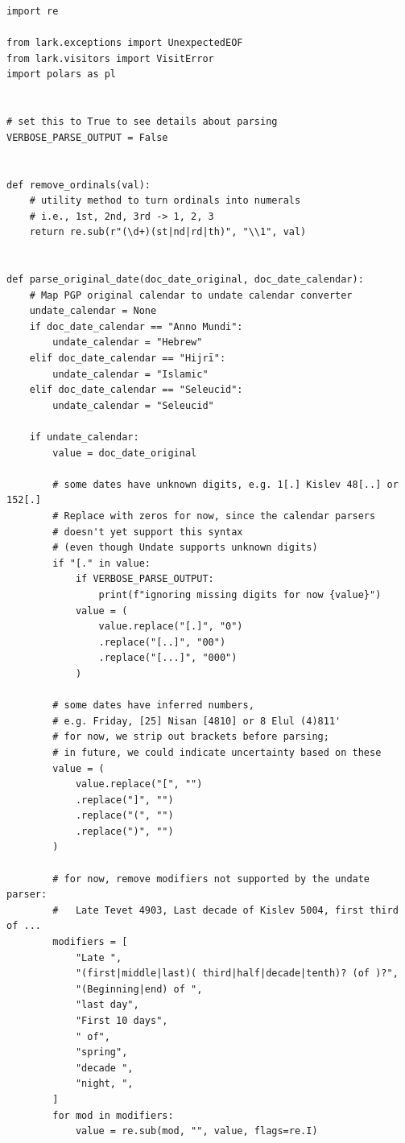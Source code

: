\documentclass[final]{anthology-ch} %
\begin{document}
\begin{verbatim}
import re

from lark.exceptions import UnexpectedEOF
from lark.visitors import VisitError
import polars as pl


# set this to True to see details about parsing
VERBOSE_PARSE_OUTPUT = False


def remove_ordinals(val):
    # utility method to turn ordinals into numerals
    # i.e., 1st, 2nd, 3rd -> 1, 2, 3
    return re.sub(r"(\d+)(st|nd|rd|th)", "\\1", val)


def parse_original_date(doc_date_original, doc_date_calendar):
    # Map PGP original calendar to undate calendar converter
    undate_calendar = None
    if doc_date_calendar == "Anno Mundi":
        undate_calendar = "Hebrew"
    elif doc_date_calendar == "Hijrī":
        undate_calendar = "Islamic"
    elif doc_date_calendar == "Seleucid":
        undate_calendar = "Seleucid"

    if undate_calendar:
        value = doc_date_original

        # some dates have unknown digits, e.g. 1[.] Kislev 48[..] or 152[.]
        # Replace with zeros for now, since the calendar parsers
        # doesn't yet support this syntax
        # (even though Undate supports unknown digits)
        if "[." in value:
            if VERBOSE_PARSE_OUTPUT:
                print(f"ignoring missing digits for now {value}")
            value = (
                value.replace("[.]", "0")
                .replace("[..]", "00")
                .replace("[...]", "000")
            )

        # some dates have inferred numbers, 
        # e.g. Friday, [25] Nisan [4810] or 8 Elul (4)811'
        # for now, we strip out brackets before parsing;
        # in future, we could indicate uncertainty based on these
        value = (
            value.replace("[", "")
            .replace("]", "")
            .replace("(", "")
            .replace(")", "")
        )

        # for now, remove modifiers not supported by the undate parser:
        #   Late Tevet 4903, Last decade of Kislev 5004, first third of ...
        modifiers = [
            "Late ",
            "(first|middle|last)( third|half|decade|tenth)? (of )?",
            "(Beginning|end) of ",
            "last day",
            "First 10 days",
            " of",
            "spring",
            "decade ",
            "night, ",
        ]
        for mod in modifiers:
            value = re.sub(mod, "", value, flags=re.I)


\end{verbatim}
\end{document}
